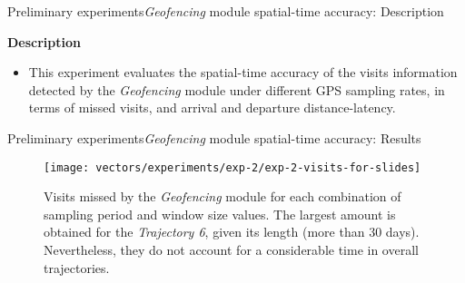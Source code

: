\begin{frame}{Preliminary experiments}{\emph{Geofencing} module spatial-time accuracy: Description}
\small 
\begin{block}{\small \textbf{Description}}
\begin{itemize}
  \item This experiment evaluates the spatial-time accuracy of the visits information detected by the \emph{Geofencing} module under different GPS sampling rates, in terms of missed visits, and arrival and departure distance-latency.
\end{itemize}
\end{block}

\begin{table}
\centering
\renewcommand{\arraystretch}{0.8}
\caption{Input parameters for the spatial-time accuracy of Geofencing module experiment.}
\label{tab:exp-2-input-parameters}
\end{table}
\end{frame}

\begin{frame}{Preliminary experiments}{\emph{Geofencing} module spatial-time accuracy: Results}
\vspace{-0.5cm}
\begin{figure}
  \centering
  \texttt{[image: vectors/experiments/exp-2/exp-2-visits-for-slides]}
  \caption{Visits missed by the \emph{Geofencing} module for each combination of sampling period and window size values. The largest amount is obtained for the \emph{Trajectory 6}, given its length (more than 30 days). Nevertheless, they do not account for a considerable time in overall trajectories.}
\end{figure}
\end{frame}


